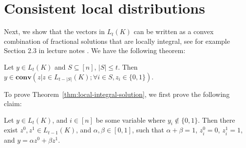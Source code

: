 \documentclass[a4paper,twoside,justified]{tufte-handout}
\begin{document}
\section{Consistent local distributions}
Next, we show that the vectors in $L_t(K)$ can be written as a convex
combination of fractional solutions that are locally integral, see for example Section 2.3 in lecture notes \cite{lasserresurvey2013}.
We have the following theorem:
\begin{theorem}\label{thm:local-integral-solution}
  Let $y \in L_t(K)$ and $S \subseteq [n]$, $|S| \le t$.
  Then $y \in \mathbf{conv}(z | z \in L_{t-|S|}(K); \forall i \in S, z_i \in \{0,1\})$.
\end{theorem}
To prove Theorem~\ref{thm:local-integral-solution}, we first prove the following claim:
\begin{claim}\label{claim:main-local-integral-claim}
  Let $y \in L_t(K)$, and $i \in [n]$ be some variable where $y_i \notin \{0,1\}$.
  Then there exist $z^0, z^1 \in L_{t-1}(K)$, and $\alpha, \beta \in [0,1]$, such that
  $\alpha+\beta=1$, $z^0_i=0$, $z^1_i=1$, and $y=\alpha z^0 + \beta z^1$.
\end{claim}
\end{document}
